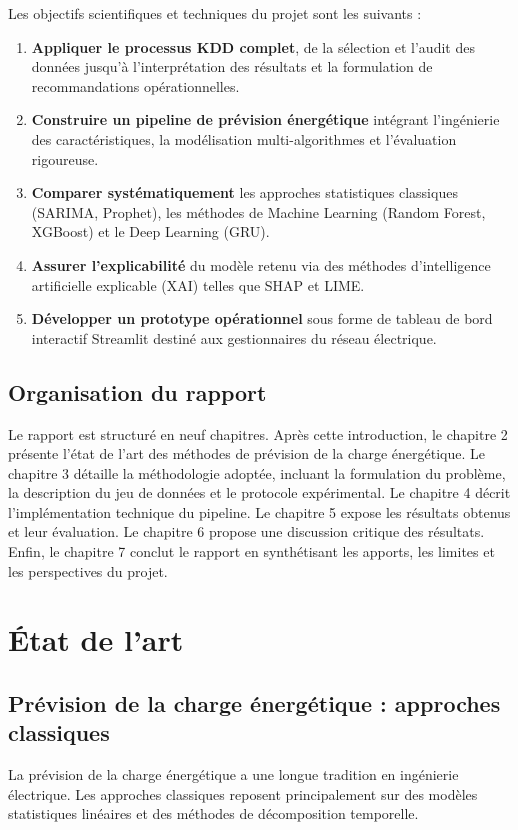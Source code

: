 \documentclass[12pt,a4paper]{article}
\begin{document}
Les objectifs scientifiques et techniques du projet sont les suivants :
\begin{enumerate}
    \item \textbf{Appliquer le processus KDD complet}, de la sélection et l'audit des données jusqu'à l'interprétation des résultats et la formulation de recommandations opérationnelles.
    \item \textbf{Construire un pipeline de prévision énergétique} intégrant l'ingénierie des caractéristiques, la modélisation multi-algorithmes et l'évaluation rigoureuse.
    \item \textbf{Comparer systématiquement} les approches statistiques classiques (SARIMA, Prophet), les méthodes de Machine Learning (Random Forest, XGBoost) et le Deep Learning (GRU).
    \item \textbf{Assurer l'explicabilité} du modèle retenu via des méthodes d'intelligence artificielle explicable (XAI) telles que SHAP et LIME.
    \item \textbf{Développer un prototype opérationnel} sous forme de tableau de bord interactif Streamlit destiné aux gestionnaires du réseau électrique.
\end{enumerate}

\subsection{Organisation du rapport}
Le rapport est structuré en neuf chapitres. Après cette introduction, le chapitre 2 présente l'état de l'art des méthodes de prévision de la charge énergétique. Le chapitre 3 détaille la méthodologie adoptée, incluant la formulation du problème, la description du jeu de données et le protocole expérimental. Le chapitre 4 décrit l'implémentation technique du pipeline. Le chapitre 5 expose les résultats obtenus et leur évaluation. Le chapitre 6 propose une discussion critique des résultats. Enfin, le chapitre 7 conclut le rapport en synthétisant les apports, les limites et les perspectives du projet.

\section{État de l'art}
\subsection{Prévision de la charge énergétique : approches classiques}
La prévision de la charge énergétique a une longue tradition en ingénierie électrique. Les approches classiques reposent principalement sur des modèles statistiques linéaires et des méthodes de décomposition temporelle.
\end{document}
